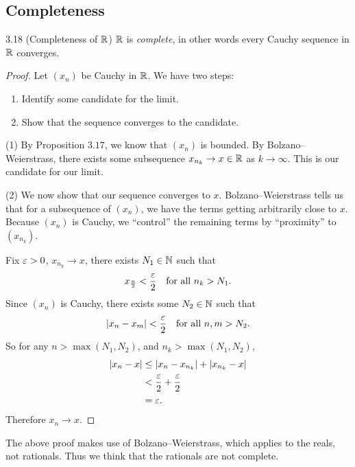 \documentclass[class=article, crop=false]{standalone}
\begin{document}
  \subsection{Completeness}
  \begin{theorem}{3.18 (Completeness of $\mathbb{R}$)}
    $\mathbb{R}$ is \emph{complete}, in other words every Cauchy sequence in $\mathbb{R}$ converges.
    \begin{proof}
      Let $(x_n)$ be Cauchy in $\mathbb{R}$. We have two steps:
      \begin{enumerate}[label=(\arabic*)]
        \item Identify some candidate for the limit.
        \item Show that the sequence converges to the candidate.
      \end{enumerate}
      (1) By Proposition $3.17$, we know that $(x_n)$ is bounded. By Bolzano--Weierstrass, there exists some subsequence $x_{n_k}\to x\in\mathbb{R}$ as $k\to\infty$. This is our candidate for our limit. \par
      (2) We now show that our sequence converges to $x$. Bolzano--Weierstrass tells us that for a subsequence of $(x_n)$, we have the terms getting arbitrarily close to $x$. Because $(x_n)$ is Cauchy, we ``control'' the remaining terms by ``proximity'' to $(x_{n_k})$. \par
      Fix $\varepsilon > 0$, $x_{n_k}\to x$, there exists $N_1\in\mathbb{N}$ such that
      \[
        x_{\frac{n}{2}} < \frac{\varepsilon}{2}\quad \text{for all }n_k > N_1.
      \]
      Since $(x_n)$ is Cauchy, there exists some $N_2\in\mathbb{N}$ such that
      \[
        \left\lvert x_n - x_m \right\rvert < \frac{\varepsilon}{2}\quad \text{for all }n,m > N_2.
      \]
      So for any $n > \max(N_1, N_2)$, and $n_k > \max(N_1, N_2)$,
      \begin{align*}
        \left\lvert x_n - x \right\rvert &\leq \left\lvert x_n - x_{n_k} \right\rvert + \left\lvert x_{n_k} - x \right\rvert \\
                      &< \frac{\varepsilon}{2} + \frac{\varepsilon}{2} \\
                      &= \varepsilon.
      \end{align*}
      Therefore $x_n\to x$.
    \end{proof}
  \end{theorem}
  \begin{note}{}
    The above proof makes use of Bolzano--Weierstrass, which applies to the reals, not rationals. Thus we think that the rationals are not complete.
  \end{note}
\end{document}
